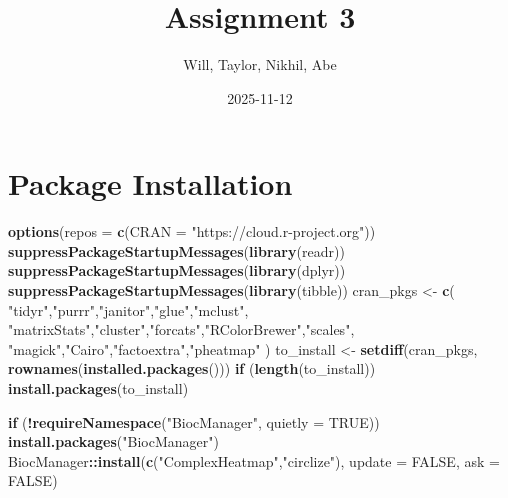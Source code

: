 \documentclass[
]{article}
\title{Assignment 3}
\author{Will, Taylor, Nikhil, Abe}
\date{2025-11-12}
\newenvironment{Shaded}{\begin{snugshade}}{\end{snugshade}}
\newcommand{\AttributeTok}[1]{\textcolor[rgb]{0.13,0.29,0.53}{#1}}
\newcommand{\ConstantTok}[1]{\textcolor[rgb]{0.56,0.35,0.01}{#1}}
\newcommand{\ControlFlowTok}[1]{\textcolor[rgb]{0.13,0.29,0.53}{\textbf{#1}}}
\newcommand{\FunctionTok}[1]{\textcolor[rgb]{0.13,0.29,0.53}{\textbf{#1}}}
\newcommand{\NormalTok}[1]{#1}
\newcommand{\OtherTok}[1]{\textcolor[rgb]{0.56,0.35,0.01}{#1}}
\newcommand{\SpecialCharTok}[1]{\textcolor[rgb]{0.81,0.36,0.00}{\textbf{#1}}}
\newcommand{\StringTok}[1]{\textcolor[rgb]{0.31,0.60,0.02}{#1}}
\begin{document}
\maketitle

\section{Package Installation}\label{package-installation}

\begin{Shaded}
\begin{Highlighting}[]
\FunctionTok{options}\NormalTok{(}\AttributeTok{repos =} \FunctionTok{c}\NormalTok{(}\AttributeTok{CRAN =} \StringTok{"https://cloud.r{-}project.org"}\NormalTok{))}
\FunctionTok{suppressPackageStartupMessages}\NormalTok{(}\FunctionTok{library}\NormalTok{(readr))}
\FunctionTok{suppressPackageStartupMessages}\NormalTok{(}\FunctionTok{library}\NormalTok{(dplyr))}
\FunctionTok{suppressPackageStartupMessages}\NormalTok{(}\FunctionTok{library}\NormalTok{(tibble))}
\NormalTok{cran\_pkgs }\OtherTok{\textless{}{-}} \FunctionTok{c}\NormalTok{(}
  \StringTok{"tidyr"}\NormalTok{,}\StringTok{"purrr"}\NormalTok{,}\StringTok{"janitor"}\NormalTok{,}\StringTok{"glue"}\NormalTok{,}\StringTok{"mclust"}\NormalTok{,}
  \StringTok{"matrixStats"}\NormalTok{,}\StringTok{"cluster"}\NormalTok{,}\StringTok{"forcats"}\NormalTok{,}\StringTok{"RColorBrewer"}\NormalTok{,}\StringTok{"scales"}\NormalTok{,}
  \StringTok{"magick"}\NormalTok{,}\StringTok{"Cairo"}\NormalTok{,}\StringTok{"factoextra"}\NormalTok{,}\StringTok{"pheatmap"}
\NormalTok{)}
\NormalTok{to\_install }\OtherTok{\textless{}{-}} \FunctionTok{setdiff}\NormalTok{(cran\_pkgs, }\FunctionTok{rownames}\NormalTok{(}\FunctionTok{installed.packages}\NormalTok{()))}
\ControlFlowTok{if}\NormalTok{ (}\FunctionTok{length}\NormalTok{(to\_install)) }\FunctionTok{install.packages}\NormalTok{(to\_install)}

\ControlFlowTok{if}\NormalTok{ (}\SpecialCharTok{!}\FunctionTok{requireNamespace}\NormalTok{(}\StringTok{"BiocManager"}\NormalTok{, }\AttributeTok{quietly =} \ConstantTok{TRUE}\NormalTok{)) }\FunctionTok{install.packages}\NormalTok{(}\StringTok{"BiocManager"}\NormalTok{)}
\NormalTok{BiocManager}\SpecialCharTok{::}\FunctionTok{install}\NormalTok{(}\FunctionTok{c}\NormalTok{(}\StringTok{"ComplexHeatmap"}\NormalTok{,}\StringTok{"circlize"}\NormalTok{), }\AttributeTok{update =} \ConstantTok{FALSE}\NormalTok{, }\AttributeTok{ask =} \ConstantTok{FALSE}\NormalTok{)}
\end{Highlighting}
\end{Shaded}
\end{document}
